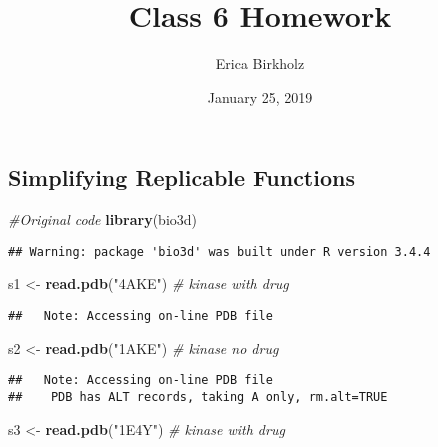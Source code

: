 \documentclass[]{article}
\title{Class 6 Homework}
\author{Erica Birkholz}
\date{January 25, 2019}
\newenvironment{Shaded}{\begin{snugshade}}{\end{snugshade}}
\newcommand{\KeywordTok}[1]{\textcolor[rgb]{0.13,0.29,0.53}{\textbf{#1}}}
\newcommand{\StringTok}[1]{\textcolor[rgb]{0.31,0.60,0.02}{#1}}
\newcommand{\CommentTok}[1]{\textcolor[rgb]{0.56,0.35,0.01}{\textit{#1}}}
\newcommand{\NormalTok}[1]{#1}
\begin{document}
\maketitle

\subsection{Simplifying Replicable
Functions}\label{simplifying-replicable-functions}

\begin{Shaded}
\begin{Highlighting}[]
\CommentTok{#Original code}
\KeywordTok{library}\NormalTok{(bio3d)}
\end{Highlighting}
\end{Shaded}

\begin{verbatim}
## Warning: package 'bio3d' was built under R version 3.4.4
\end{verbatim}

\begin{Shaded}
\begin{Highlighting}[]
\NormalTok{s1 <-}\StringTok{ }\KeywordTok{read.pdb}\NormalTok{(}\StringTok{"4AKE"}\NormalTok{) }\CommentTok{# kinase with drug}
\end{Highlighting}
\end{Shaded}

\begin{verbatim}
##   Note: Accessing on-line PDB file
\end{verbatim}

\begin{Shaded}
\begin{Highlighting}[]
\NormalTok{s2 <-}\StringTok{ }\KeywordTok{read.pdb}\NormalTok{(}\StringTok{"1AKE"}\NormalTok{) }\CommentTok{# kinase no drug}
\end{Highlighting}
\end{Shaded}

\begin{verbatim}
##   Note: Accessing on-line PDB file
##    PDB has ALT records, taking A only, rm.alt=TRUE
\end{verbatim}

\begin{Shaded}
\begin{Highlighting}[]
\NormalTok{s3 <-}\StringTok{ }\KeywordTok{read.pdb}\NormalTok{(}\StringTok{"1E4Y"}\NormalTok{) }\CommentTok{# kinase with drug}
\end{Highlighting}
\end{Shaded}
\end{document}
